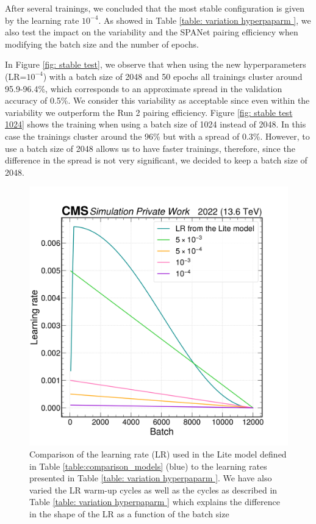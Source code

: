After several trainings, we concluded that the most stable configuration is given by the learning rate $10^{-4}$. As showed in Table \ref{table: variation hyperpaparm }, we also test the impact on the variability and the SPANet pairing efficiency when modifying the batch size and the number of epochs.

In Figure \ref{fig: stable test}, we observe that when using the new hyperparameters (LR=$10^{-4}$) with a batch size of 2048 and 50 epochs all trainings cluster around 95.9-96.4\%, which corresponds to an approximate spread in the validation accuracy of 0.5\%. We consider this variability as acceptable since even within the variability we outperform the Run 2 pairing efficiency. Figure \ref{fig: stable test 1024} shows the training when using a batch size of 1024 instead of 2048. In this case the trainings cluster around the 96\% but with a spread of 0.3\%. However, to use a batch size of 2048 allows us to have faster trainings, therefore, since the difference in the spread is not very significant, we decided to keep a batch size of 2048. 

\begin{figure}[hbt]
    \centering
    \includegraphics[width=0.6\linewidth]{Images/6.Improving/Variability Study/learning rate comp.png}
    \caption{Comparison of the learning rate (LR) used in the Lite model defined in Table \ref{table:comparison_models} (blue) to the learning rates presented in Table \ref{table: variation hyperpaparm }. We have also varied the LR warm-up cycles as well as the cycles as described in Table \ref{table: variation hyperpaparm } which explains the difference in the shape of the LR as a function of the batch size}
    \label{fig: lr comp}
\end{figure}

